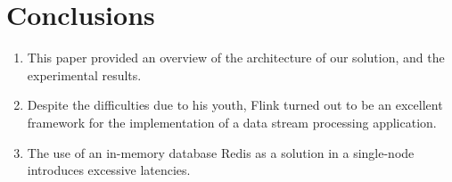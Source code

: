 \section{Conclusions}
\label{sec:conclusions}

\begin{enumerate}
	\item This paper provided an overview of the architecture of our solution, and the experimental results. 
	
	\item Despite the difficulties due to his youth, Flink turned out to be an excellent framework for the implementation of a data stream processing application.
	
	\item The use of an in-memory database Redis as a solution in a single-node introduces excessive latencies.
\end{enumerate}



